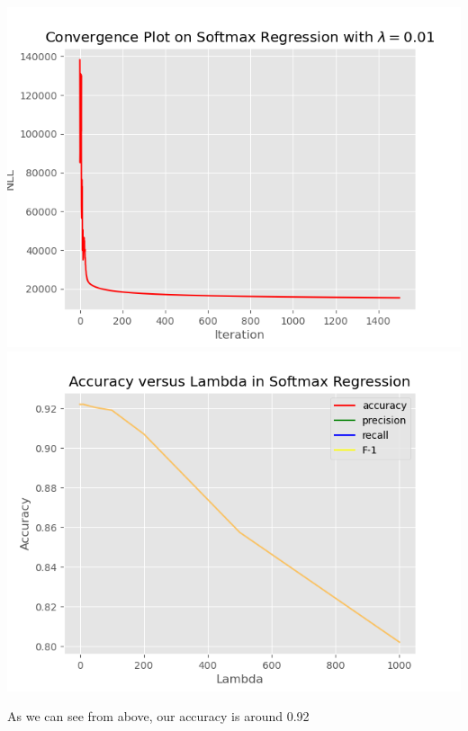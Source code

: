\documentclass[12pt,letterpaper,fleqn]{hmcpset}
\begin{document}
\begin{solution}
\begin{enumerate}[(a)]
	\includegraphics[scale=0.5]{hw4pr2b_convergence.png}
	\includegraphics[scale=0.5]{hw4pr2b_lva.png}
	 
	As we can see from above, our accuracy is around 0.92
\end{enumerate}
\end{solution}
\newpage
\end{document}
